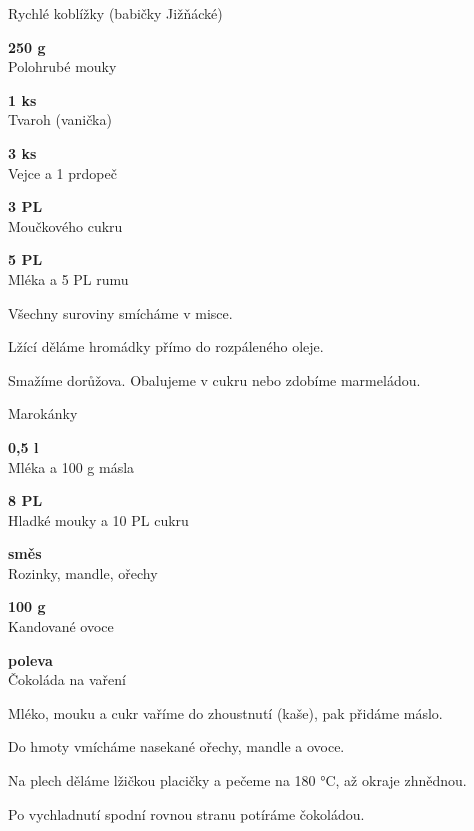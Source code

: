 \documentclass[11pt,a4paper]{article}
\begin{document}
\begin{recipe}[OrangeRed]{Rychlé koblížky (babičky Jižňácké)}
    \begin{ingredients}
        \item \parbox[t]{\linewidth}{\raggedright \weight \textbf{250 g}\\ Polohrubé mouky}
        \item \parbox[t]{\linewidth}{\raggedright \piece \textbf{1 ks}\\ Tvaroh (vanička)}
        \item \parbox[t]{\linewidth}{\raggedright \piece \textbf{3 ks}\\ Vejce a 1 prdopeč}
        \item \parbox[t]{\linewidth}{\raggedright \spoon \textbf{3 PL}\\ Moučkového cukru}
        \item \parbox[t]{\linewidth}{\raggedright \liquid \textbf{5 PL}\\ Mléka a 5 PL rumu}
    \end{ingredients}
    \begin{steps}
        \item Všechny suroviny smícháme v misce.
        \item Lžící děláme hromádky přímo do rozpáleného oleje.
        \item Smažíme dorůžova. Obalujeme v cukru nebo zdobíme marmeládou.
    \end{steps}
\end{recipe}

\begin{recipe}[BurntOrange]{Marokánky}
    \begin{ingredients}
        \item \parbox[t]{\linewidth}{\raggedright \liquid \textbf{0,5 l}\\ Mléka a 100 g másla}
        \item \parbox[t]{\linewidth}{\raggedright \weight \textbf{8 PL}\\ Hladké mouky a 10 PL cukru}
        \item \parbox[t]{\linewidth}{\raggedright \indefinite \textbf{směs}\\ Rozinky, mandle, ořechy}
        \item \parbox[t]{\linewidth}{\raggedright \piece \textbf{100 g}\\ Kandované ovoce}
        \item \parbox[t]{\linewidth}{\raggedright \indefinite \textbf{poleva}\\ Čokoláda na vaření}
    \end{ingredients}
    \begin{steps}
        \item Mléko, mouku a cukr vaříme do zhoustnutí (kaše), pak přidáme máslo.
        \item Do hmoty vmícháme nasekané ořechy, mandle a ovoce.
        \item Na plech děláme lžičkou placičky a pečeme na 180 °C, až okraje zhnědnou.
        \item Po vychladnutí spodní rovnou stranu potíráme čokoládou.
    \end{steps}
\end{recipe}
\end{document}
